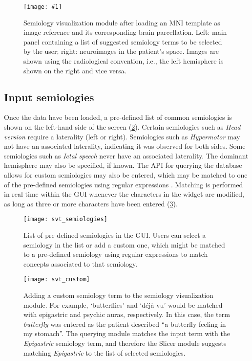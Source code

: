 \newcommand{\svtscreenshot}[1]{
  \texttt{[image: \#1]}
}

\begin{figure}
  \centering
  \svtscreenshot{svt_loaded}
  \caption[Semiology visualization module after loading a patient's data]{
    Semiology visualization module after loading an \ac{MNI} template as image reference and its corresponding brain parcellation.
    Left: main panel containing a list of suggested semiology terms to be selected by the user;
    right: neuroimages in the patient's space.
    Images are shown using the radiological convention, i.e., the left hemisphere is shown on the right and vice versa.
  }
  \label{fig:svt_loaded}
\end{figure}


\subsection{Input semiologies}
\label{sec:svt_semiologies}

Once the data have been loaded, a pre-defined list of common semiologies is shown on the left-hand side of the screen (\cref{fig:svt_semiologies}).
Certain semiologies such as \textit{Head version} require a laterality (left or right).
Semiologies such as \textit{Hypermotor} may not have an associated laterality, indicating it was observed for both sides.
Some semiologies such as \textit{Ictal speech} never have an associated laterality.
The dominant hemisphere may also be specified, if known.
The \ac{API} for querying the database allows for custom semiologies may also be entered, which may be matched to one of the pre-defined semiologies using regular expressions \cite{alim-marvasti_mapping_2021}.
Matching is performed in real time within the \ac{GUI} whenever the characters in the widget are modified, as long as three or more characters have been entered (\cref{fig:svt_custom}).

\begin{figure}
  \centering
  \texttt{[image: svt\_semiologies]}
  \caption[List of pre-defined semiologies in the GUI]{
    List of pre-defined semiologies in the \ac{GUI}.
    Users can select a semiology in the list or add a custom one, which might be matched to a pre-defined semiology using regular expressions to match concepts associated to that semiology.
  }
  \label{fig:svt_semiologies}
\end{figure}

\begin{figure}
  \centering
  \texttt{[image: svt\_custom]}
  \caption[Adding a custom semiology to the semiology visualization module]{
    Adding a custom semiology term to the semiology visualization module.
    For example, `butterflies' and `déjà vu' would be matched with epigastric and psychic auras, respectively.
    In this case, the term \textit{butterfly} was entered as the patient described ``a butterfly feeling in my stomach''.
    The querying module matches the input term with the \textit{Epigastric} semiology term, and therefore the Slicer module suggests matching \textit{Epigastric} to the list of selected semiologies.
  }
  \label{fig:svt_custom}
\end{figure}


